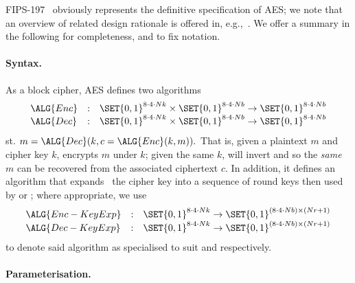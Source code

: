 
FIPS-197~\cite{FIPS:197} obviously represents the definitive specification
of AES; we note that an overview of related design rationale is offered in,
e.g.,~\cite{DaeRij:02}.  We offer a summary in the following \SEC[s] for
completeness, and to fix notation.


\paragraph{Syntax.}

As a block cipher, AES defines two algorithms
\[
\begin{array}{lcl}
\ALG{Enc} &:& \SET{ 0, 1 }^{8 \cdot 4 \cdot Nk} \times \SET{ 0, 1 }^{8 \cdot 4 \cdot Nb} \rightarrow \SET{ 0, 1 }^{8 \cdot 4 \cdot Nb} \\
\ALG{Dec} &:& \SET{ 0, 1 }^{8 \cdot 4 \cdot Nk} \times \SET{ 0, 1 }^{8 \cdot 4 \cdot Nb} \rightarrow \SET{ 0, 1 }^{8 \cdot 4 \cdot Nb} \\
\end{array}
\]
st.
$
m = \ALG{Dec}( k, c = \ALG{Enc}( k, m ) ) .
$
That is, given a plaintext $m$ and cipher key $k$,  encrypts $m$ 
under $k$; given the same $k$,  will invert  and so the
{\em same} $m$ can be recovered from the associated ciphertext $c$.  
In addition, it defines an algorithm
that expands~\cite[Section 5.2]{FIPS:197} the cipher key into a sequence 
of round keys then used by
or
;
where appropriate, we use
\[
\begin{array}{lcl}
\ALG{Enc-KeyExp} &:& \SET{ 0, 1 }^{8 \cdot 4 \cdot Nk} \rightarrow \SET{ 0, 1 }^{( 8 \cdot 4 \cdot Nb ) \times ( Nr + 1 )} \\
\ALG{Dec-KeyExp} &:& \SET{ 0, 1 }^{8 \cdot 4 \cdot Nk} \rightarrow \SET{ 0, 1 }^{( 8 \cdot 4 \cdot Nb ) \times ( Nr + 1 )} \\
\end{array}
\]
to denote said algorithm as specialised to suit
and
respectively.


\paragraph{Parameterisation.}

